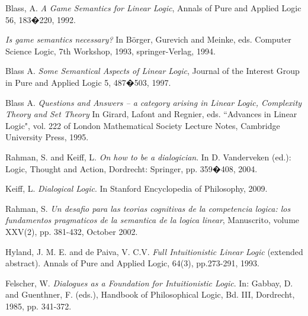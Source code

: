 \documentclass{article}
\begin{document}


%
%



 \begin{thebibliography}{000}


 Blass, A. {\it A Game Semantics for Linear Logic}, Annals of Pure and 
Applied Logic 56, 183�220, 1992. 

 {\it Is game semantics necessary?} In B\"orger, Gurevich and Meinke, eds. Computer Science Logic, 7th Workshop, 1993, springer-Verlag, 1994.

 Blass A. {\it Some Semantical Aspects of Linear Logic}, Journal of the 
Interest Group in Pure and Applied Logic 5, 487�503, 1997.

  Blass A. {\it Questions and Answers -- a category arising in Linear Logic, Complexity Theory and Set Theory} In Girard, Lafont and Regnier,  eds. ``Advances in Linear Logic", vol. 222 of London Mathematical Society Lecture Notes, Cambridge University Press, 1995.

 Rahman, S. and Keiff, L. {\it On how to be a dialogician}. In D. Vanderveken (ed.): Logic, Thought and Action, Dordrecht: Springer, pp. 359�408, 2004.

 Keiff, L. {\it Dialogical Logic}. In Stanford Encyclopedia of Philosophy, 2009.

 Rahman, S. {\it Un desafio para las  teorias cognitivas de la competencia logica: los fundamentos pragmaticos de la semantica de la logica linear}, Manuscrito, volume XXV(2), pp. 381-432, October 2002. 

 Hyland, J. M. E. and de Paiva, V. C.V. {\it Full Intuitionistic Linear Logic} (extended abstract). Annals of Pure and Applied Logic, 64(3), pp.273-291, 1993.

Felscher, W. {\it Dialogues as a Foundation for Intuitionistic 
Logic}. In: Gabbay, D. and  Guenthner, F. (eds.), Handbook of 
Philosophical Logic, Bd. III, Dordrecht, 1985, pp. 341-372. 

 \end{thebibliography}
\end{document}
